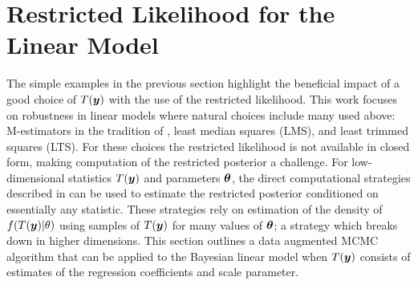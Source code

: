 \documentclass[ba]{imsart}
\def\bth{\mbox{\boldmath $\theta$}}
\newcommand{\by}{\mbox{\boldmath $y$}}
\begin{document}
\section{Restricted Likelihood for the Linear Model}
\label{BayesLinMod}
The simple examples in the previous section highlight the beneficial impact of a good choice of $T(\by)$ with the use of the restricted likelihood. This work focuses on robustness in linear models where natural choices include many used above:  M-estimators in the tradition of \cite{huber1964}, least median squares (LMS), and least trimmed squares (LTS). For these choices the restricted likelihood is not available in closed form, making computation of the restricted posterior a challenge. For low-dimensional statistics $T(\by)$ and parameters $\bth$, the direct computational strategies described in \cite{lewis2014} can be used to estimate the restricted posterior conditioned on essentially any statistic.  These strategies rely on estimation of the density of $f(T(\by)|\theta)$ using samples of $T(\by)$ for many values of $\bth$; a strategy which breaks down in higher dimensions. This section outlines a data augmented MCMC algorithm that can be applied to the Bayesian linear model when $T(\by)$ consists of estimates of the regression coefficients and scale parameter. 
\end{document}
